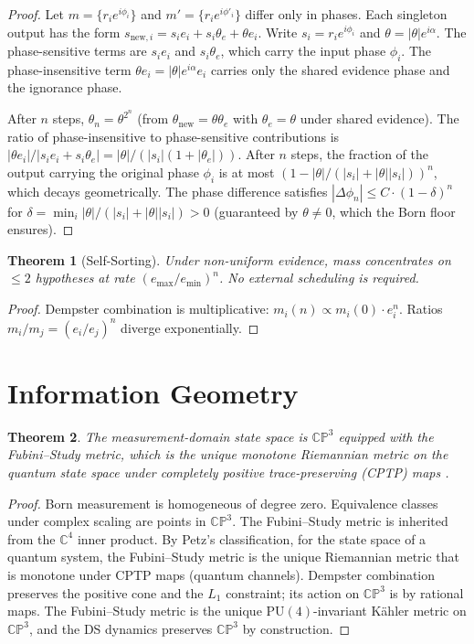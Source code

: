 \documentclass[11pt,a4paper]{article}
\newtheorem{theorem}{Theorem}[section]
\theoremstyle{definition}
\theoremstyle{remark}
\newcommand{\CP}{\mathbb{CP}}
\newcommand{\C}{\mathbb{C}}
\begin{document}
\begin{proof}
Let $m=\{r_ie^{i\phi_i}\}$ and $m'=\{r_ie^{i\phi'_i}\}$ differ only in phases. Each singleton output has the form $s_{\mathrm{new},i}=s_ie_i+s_i\theta_e+\theta e_i$. Write $s_i=r_ie^{i\phi_i}$ and $\theta=|\theta|e^{i\alpha}$. The phase-sensitive terms are $s_ie_i$ and $s_i\theta_e$, which carry the input phase $\phi_i$. The phase-insensitive term $\theta e_i=|\theta|e^{i\alpha}e_i$ carries only the shared evidence phase and the ignorance phase.

After $n$ steps, $\theta_n=\theta^{2^n}$ (from $\theta_{\mathrm{new}}=\theta\theta_e$ with $\theta_e=\theta$ under shared evidence). The ratio of phase-insensitive to phase-sensitive contributions is $|\theta e_i|/|s_ie_i+s_i\theta_e|=|\theta|/(|s_i|(1+|\theta_e|))$. After $n$ steps, the fraction of the output carrying the original phase $\phi_i$ is at most $(1-|\theta|/(|s_i|+|\theta||s_i|))^n$, which decays geometrically. The phase difference satisfies $|\Delta\phi_n|\leq C\cdot(1-\delta)^n$ for $\delta=\min_i|\theta|/(|s_i|+|\theta||s_i|)>0$ (guaranteed by $\theta\neq 0$, which the Born floor ensures).
\end{proof}

\begin{theorem}[Self-Sorting]\label{thm:selfsort}
Under non-uniform evidence, mass concentrates on $\leq 2$ hypotheses at rate $(e_{\max}/e_{\min})^n$. No external scheduling is required.
\end{theorem}

\begin{proof}
Dempster combination is multiplicative: $m_i(n)\propto m_i(0)\cdot e_i^n$. Ratios $m_i/m_j=(e_i/e_j)^n$ diverge exponentially.
\end{proof}


\section{Information Geometry}\label{sec:geometry}

\begin{theorem}\label{thm:fubini}
The measurement-domain state space is $\CP^3$ equipped with the Fubini--Study metric, which is the unique monotone Riemannian metric on the quantum state space under completely positive trace-preserving (CPTP) maps \cite{Petz1996}.
\end{theorem}

\begin{proof}
Born measurement is homogeneous of degree zero. Equivalence classes under complex scaling are points in $\CP^3$. The Fubini--Study metric is inherited from the $\C^4$ inner product. By Petz's classification, for the state space of a quantum system, the Fubini--Study metric is the unique Riemannian metric that is monotone under CPTP maps (quantum channels). Dempster combination preserves the positive cone and the $L_1$ constraint; its action on $\CP^3$ is by rational maps. The Fubini--Study metric is the unique $\mathrm{PU}(4)$-invariant K\"ahler metric on $\CP^3$, and the DS dynamics preserves $\CP^3$ by construction.
\end{proof}
\end{document}
